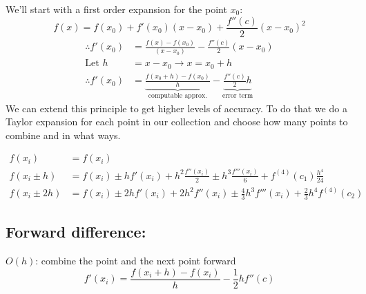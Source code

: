 \documentclass[12pt]{article}
\begin{document}
We'll start with a first order expansion for the point $x_0$:
\[
f(x) = f(x_0) + f'(x_0)(x - x_0) + \frac{f''(c)}{2}(x-x_0)^2 \]
\begin{align*}
% 
\therefore f'(x_0) &= \frac{f(x) - f(x_0)}{(x - x_0)} - \frac{f''(c)}{2}(x-x_0) \\
%
\text{Let } h &= x-x_0 \rightarrow x = x_0 + h \\
%
\therefore f'(x_0) &= \underbrace{\frac{f(x_0 + h) - f(x_0)}{h}}_{\text{computable approx.}} - \underbrace{\frac{f''(c)}{2}h}_{\text{error term}}
\end{align*}
%
We can extend this principle to get higher levels of accuracy. To do that we do a Taylor expansion for each point in our collection and choose how many points to combine and in what ways. 
%
\begin{center}
\end{center}
%
\vspace*{-2em}
\begin{align*}
f(x_i) &= f(x_i)\\
%
f(x_i \pm h) &= f(x_i) \pm hf'(x_i) + h^2\frac{f''(x_i)}{2} \pm h^3\frac{f'''(x_i)}{6} + f^{(4)}(c_1)\frac{h^4}{24} \\
%
f(x_i \pm 2h) &= f(x_i) \pm 2h f'(x_i) + 2 h^2 f''(x_i) \pm \frac{4}{3} h^3 f'''(x_i) + \frac{2}{3}h^4 f^{(4)}(c_2)
\end{align*}


\subsection*{Forward difference:}
\underline{$O(h)$}: combine the point and the next point forward
\[f'(x_i) = \frac{f(x_i + h) - f(x_i)}{h} - \frac{1}{2}hf''(c)\]
\end{document}
